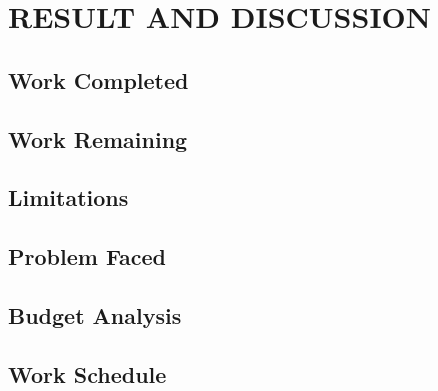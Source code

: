 \newpage
\section{RESULT AND DISCUSSION}
\subsection{Work Completed}
\subsection{Work Remaining}
\subsection{Limitations}
\subsection{Problem Faced}
\subsection{Budget Analysis}
\subsection{Work Schedule}